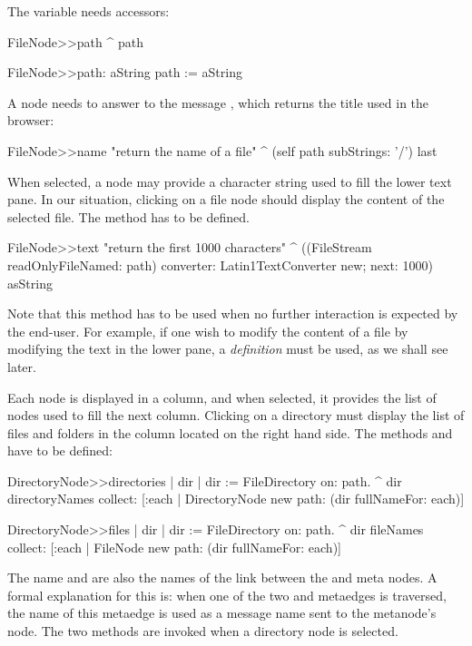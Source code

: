 \documentclass[a4paper,10pt,twoside]{book}
\begin{document}
The  variable needs accessors:

\begin{code}{}    
FileNode>>path
	^ path

FileNode>>path: aString
	path := aString
\end{code}

A node needs to answer to the message , which returns the title used in the browser:

\begin{code}{}    
FileNode>>name
	"return the name of a file"
	^ (self path subStrings: '/') last
\end{code}

When selected, a node may provide a character string used to fill the lower text pane. In our situation, clicking on a file node should display the content of the selected file. The method  has to be defined. 

\begin{code}{}    
FileNode>>text
	"return the first 1000 characters"
     ^ ((FileStream readOnlyFileNamed: path) converter: Latin1TextConverter new; 
              next: 1000) asString
\end{code}

Note that this method  has to be used when no further interaction is expected by the end-user. For example, if one wish to modify the content of a file by modifying the text in the lower pane, a \emph{definition} must be used, as we shall see later.

Each node is displayed in a column, and when selected, it provides the list of nodes used to fill the next column. Clicking on a directory must display the list of files and folders in the column located on the right hand side. The methods  and  have to be defined:

\begin{code}{}    
DirectoryNode>>directories
     | dir | 
     dir := FileDirectory on: path.
     ^ dir directoryNames collect: [:each | 
                            DirectoryNode new path: (dir fullNameFor: each)]

DirectoryNode>>files
    | dir | 
     dir := FileDirectory on:  path.
     ^ dir fileNames collect: [:each | 
                            FileNode new path: (dir fullNameFor: each)]
\end{code}

The name  and  are also the names of the link between the  and  meta nodes. A formal explanation for this is: when one of the two  and  metaedges is traversed, the name of this metaedge is used as a message name sent to the metanode's node. The two methods are invoked when a directory node is selected.
\end{document}
